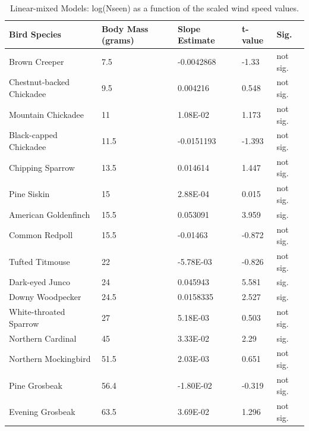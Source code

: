 \begin{longtable}[c]{|l|l|l|l|l|}
\caption{Linear-mixed Models: log(Nseen) as a function of the scaled wind speed values.}
\label{my-label}\\
\hline
Bird Species              & Body Mass (grams) & Slope Estimate & t-value & Sig.     \\ \hline
\endhead
%
Brown Creeper             & 7.5               & -0.0042868     & -1.33   & not sig. \\ \hline
Chestnut-backed Chickadee & 9.5               & 0.004216       & 0.548   & not sig. \\ \hline
Mountain Chickadee        & 11                & 1.08E-02       & 1.173   & not sig. \\ \hline
Black-capped Chickadee    & 11.5              & -0.0151193     & -1.393  & not sig. \\ \hline
Chipping Sparrow          & 13.5              & 0.014614       & 1.447   & not sig. \\ \hline
Pine Siskin               & 15                & 2.88E-04       & 0.015   & not sig. \\ \hline
American Goldenfinch      & 15.5              & 0.053091       & 3.959   & sig.     \\ \hline
Common Redpoll            & 15.5              & -0.01463       & -0.872  & not sig. \\ \hline
Tufted Titmouse           & 22                & -5.78E-03      & -0.826  & not sig. \\ \hline
Dark-eyed Junco           & 24                & 0.045943       & 5.581   & sig.     \\ \hline
Downy Woodpecker          & 24.5              & 0.0158335      & 2.527   & sig.     \\ \hline
White-throated Sparrow    & 27                & 5.18E-03       & 0.503   & not sig. \\ \hline
Northern Cardinal         & 45                & 3.33E-02       & 2.29    & sig.     \\ \hline
Northern Mockingbird      & 51.5              & 2.03E-03       & 0.651   & not sig. \\ \hline
Pine Grosbeak             & 56.4              & -1.80E-02      & -0.319  & not sig. \\ \hline
Evening Grosbeak          & 63.5              & 3.69E-02       & 1.296   & not sig. \\ \hline

\end{longtable}
